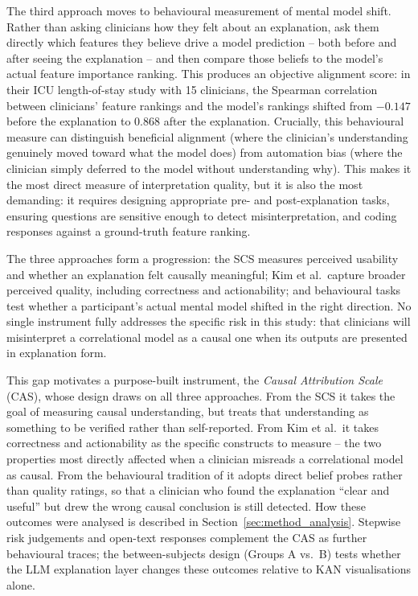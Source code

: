 \documentclass[12pt, a4paper]{article}
\begin{document}
The third approach moves to behavioural measurement of mental
model shift. Rather than asking clinicians how they felt about an
explanation, \citet{jung2025evaluating} ask them directly which
features they believe drive a model prediction -- both before and
after seeing the explanation -- and then compare those beliefs to
the model's actual feature importance ranking. This produces an
objective alignment score: in their ICU length-of-stay study with
15 clinicians, the Spearman correlation between clinicians' feature
rankings and the model's rankings shifted from $-0.147$ before the explanation 
to $0.868$ after the explanation. Crucially, this behavioural measure can distinguish
beneficial alignment (where the clinician's understanding
genuinely moved toward what the model does) from automation
bias (where the clinician simply deferred to the model without
understanding why). This makes it the most direct measure of
interpretation quality, but it is also the most demanding: it
requires designing appropriate pre- and post-explanation tasks,
ensuring questions are sensitive enough to detect misinterpretation,
and coding responses against a ground-truth feature ranking.

The three approaches form a progression: the SCS measures perceived
usability and whether an explanation felt causally meaningful; Kim et
al.\ capture broader perceived quality, including correctness and
actionability; and behavioural tasks test whether a participant's actual
mental model shifted in the right direction. No single instrument fully
addresses the specific risk in this study: that clinicians will misinterpret
a correlational model as a causal one when its outputs are presented in
explanation form.

This gap motivates a purpose-built instrument, the \emph{Causal Attribution
Scale} (CAS), whose design draws on all three approaches. From the SCS it
takes the goal of measuring causal understanding, but treats that
understanding as something to be verified rather than self-reported. From
Kim et al.\ it takes correctness and actionability as the specific
constructs to measure -- the two properties most directly affected when
a clinician misreads a correlational model as causal. From the behavioural tradition of \citet{jung2025evaluating}
it adopts direct belief probes rather than quality ratings, so that a
clinician who found the explanation ``clear and useful'' but drew the wrong
causal conclusion is still detected. How these outcomes were analysed
is described in Section~\ref{sec:method_analysis}. Stepwise risk judgements and
open-text responses complement the CAS as further behavioural traces;
the between-subjects design (Groups A vs.\ B) tests whether the LLM
explanation layer changes these outcomes relative to KAN visualisations alone.
\end{document}
